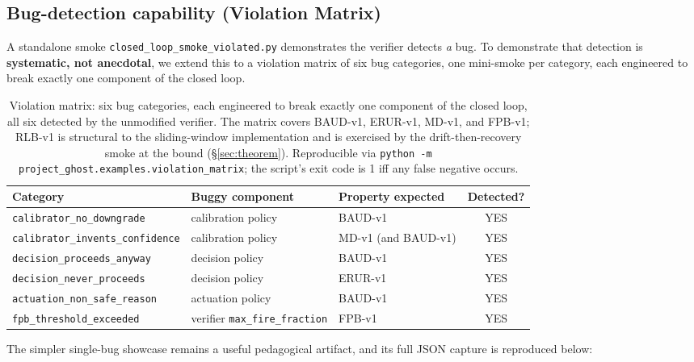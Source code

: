 \documentclass[11pt,a4paper]{article}
\begin{document}
\subsection{Bug-detection capability (Violation Matrix)}
\label{sec:violation}

A standalone smoke \texttt{closed\_loop\_smoke\_violated.py}
demonstrates the verifier detects \emph{a} bug. To demonstrate that
detection is \textbf{systematic, not anecdotal}, we extend this to
a violation matrix of six bug categories, one mini-smoke per
category, each engineered to break exactly one component of the
closed loop.

\begin{table}[h]
\centering
\small
\begin{tabular}{lll c}
\toprule
\textbf{Category} & \textbf{Buggy component} & \textbf{Property expected} & \textbf{Detected?} \\
\midrule
\texttt{calibrator\_no\_downgrade}        & calibration policy           & BAUD-v1               & YES \\
\texttt{calibrator\_invents\_confidence}  & calibration policy           & MD-v1 (and BAUD-v1)   & YES \\
\texttt{decision\_proceeds\_anyway}       & decision policy              & BAUD-v1               & YES \\
\texttt{decision\_never\_proceeds}        & decision policy              & ERUR-v1               & YES \\
\texttt{actuation\_non\_safe\_reason}     & actuation policy             & BAUD-v1               & YES \\
\texttt{fpb\_threshold\_exceeded}         & verifier \texttt{max\_fire\_fraction} & FPB-v1     & YES \\
\bottomrule
\end{tabular}
\caption{Violation matrix: six bug categories, each engineered to
break exactly one component of the closed loop, all six detected
by the unmodified verifier. The matrix covers BAUD-v1, ERUR-v1,
MD-v1, and FPB-v1; RLB-v1 is structural to the sliding-window
implementation and is exercised by the drift-then-recovery smoke at
the bound (\S\ref{sec:theorem}). Reproducible via
\texttt{python -m project\_ghost.examples.violation\_matrix};
the script's exit code is 1 iff any false negative occurs.}
\label{tab:violation-matrix}
\end{table}

The simpler single-bug showcase remains a useful pedagogical
artifact, and its full JSON capture is reproduced below:
\end{document}
